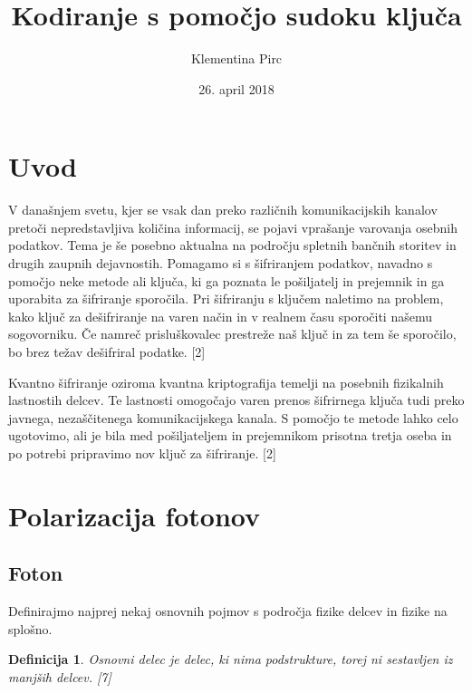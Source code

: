 \documentclass[A4paper, 11pt]{article}
\title{Kodiranje s pomočjo sudoku ključa}
\author{Klementina Pirc}
\affil{Fakulteta za matematiko in fiziko \\ Oddelek za matematiko}
\date{26. april 2018}
\newtheorem{definicija}{Definicija}
\begin{document}
\begin{titlepage} 

\maketitle
\thispagestyle{empty}
	
\end{titlepage}



\section{Uvod}

V današnjem svetu, kjer se vsak dan preko različnih komunikacijskih kanalov pretoči nepredstavljiva količina informacij, se pojavi vprašanje varovanja osebnih podatkov. Tema je še posebno aktualna na področju spletnih bančnih storitev in drugih zaupnih dejavnostih. Pomagamo si s šifriranjem podatkov, navadno s pomočjo neke metode ali ključa, ki ga poznata le pošiljatelj in prejemnik in ga uporabita za šifriranje sporočila. Pri šifriranju s ključem naletimo na problem, kako ključ za dešifriranje na varen način in v realnem času sporočiti našemu sogovorniku. Če namreč prisluškovalec prestreže naš ključ in za tem še sporočilo, bo brez težav dešifriral podatke. [2]

Kvantno šifriranje oziroma kvantna kriptografija temelji na posebnih fizikalnih lastnostih delcev. Te lastnosti omogočajo varen prenos šifrirnega ključa tudi preko javnega, nezaščitenega komunikacijskega kanala. S pomočjo te metode lahko celo ugotovimo, ali je bila med pošiljateljem in prejemnikom prisotna tretja oseba in po potrebi pripravimo nov ključ za šifriranje. [2]



\section{Polarizacija fotonov}

\subsection{Foton}

Definirajmo najprej nekaj osnovnih pojmov s področja fizike delcev in fizike na splošno.

\begin{definicija}
Osnovni delec je delec, ki nima podstrukture, torej ni sestavljen iz manjših delcev. [7]
\end{definicija}
\end{document}
